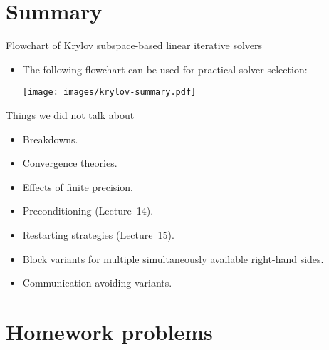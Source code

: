 \documentclass[t,usepdftitle=false]{beamer}
\begin{document}
\section{Summary}
\begin{frame}{Flowchart of Krylov subspace-based linear iterative solvers}
\begin{itemize}
\item The following flowchart can be used for practical solver selection: 
\begin{center}
\texttt{[image: images/krylov-summary.pdf]}
\end{center}
\end{itemize}
\end{frame}

\begin{frame}{Things we did not talk about}
\begin{itemize}
\item Breakdowns.
\item Convergence theories.
\item Effects of finite precision.
\item Preconditioning (Lecture~14).
\item Restarting strategies (Lecture~15).
\item Block variants for multiple simultaneously available right-hand sides.
\item Communication-avoiding variants.
\end{itemize}
\end{frame}

\section{Homework problems}
\end{document}
